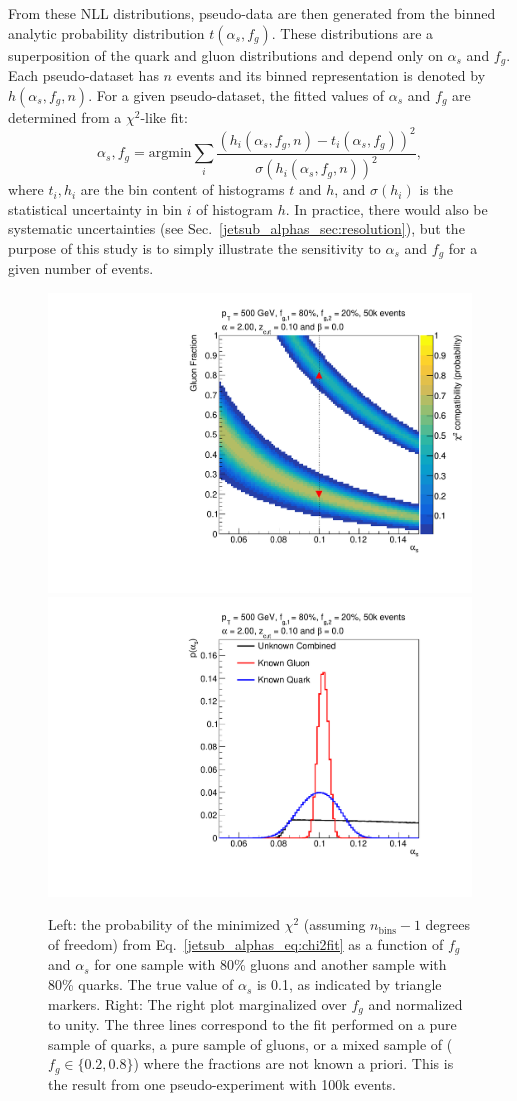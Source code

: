 \documentclass[11pt]{cernrep}
\begin{document}
From these NLL distributions, pseudo-data are then generated from the binned analytic probability distribution $t(\alpha_s,f_g)$.
%
These distributions are a superposition of the quark and gluon distributions and depend only on $\alpha_s$ and $f_g$.
%
Each pseudo-dataset has $n$ events and its binned representation is denoted by $h(\alpha_s,f_g,n)$.
%
For a given pseudo-dataset, the fitted values of $\alpha_s$ and $f_g$ are determined from a $\chi^2$-like fit:
%
\begin{equation}
\label{jetsub_alphas_eq:chi2fit}
\alpha_s,f_g=\mathrm{argmin} \sum_i \frac{\left(h_i(\alpha_s,f_g,n)-t_i(\alpha_s,f_g)\right)^2}{\sigma(h_i(\alpha_s,f_g,n))^2},
\end{equation}
%
where $t_i, h_i$ are the bin content of histograms $t$ and $h$, and $\sigma(h_i)$ is the statistical uncertainty in bin $i$ of histogram $h$.
%
In practice, there would also be systematic uncertainties (see Sec.~\ref{jetsub_alphas_sec:resolution}), but the purpose of this study is to simply illustrate the sensitivity to $\alpha_s$ and $f_g$ for a given number of events.


	
\begin{figure}[t]
\begin{center}
\includegraphics[width = 0.49\columnwidth]{jetsub_alphas_banana_alpha_20beta_0_zcut_123451324.pdf}
\includegraphics[width = 0.49\columnwidth]{jetsub_alphas_palpha_alpha_20beta_0_zcut_123451324.pdf}
\end{center}
\caption{Left: the probability of the minimized $\chi^2$ (assuming $n_\mathrm{bins}-1$ degrees of freedom) from Eq.~\ref{jetsub_alphas_eq:chi2fit} as a
  function of $f_g$ and $\alpha_s$ for one sample with 80\% gluons and another sample with 80\% quarks.  The true value of $\alpha_s$ is 0.1, as indicated by triangle markers.  Right: The right plot marginalized over $f_g$ and normalized to unity.  The three lines correspond to the fit performed on a pure sample of quarks, a pure sample of gluons, or a mixed sample of ($f_g\in\{0.2,0.8\}$) where the fractions are not known a priori.  This is the result from one pseudo-experiment with 100k events.}
\label{jetsub_alphas_fig:alpha2fit}
\end{figure}
\end{document}
